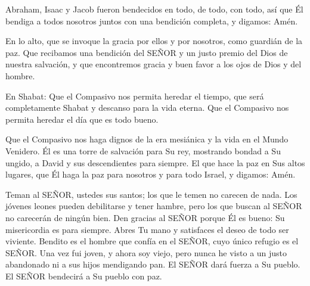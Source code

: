\documentclass[12pt,twoside]{article}
\begin{document}
{\begin{minipage}[t]{\linewidth}
{Abraham, Isaac y Jacob fueron bendecidos en todo, de todo, con todo,  
así que Él bendiga a todos nosotros juntos con una bendición completa,  
y digamos: Amén.\par\vspace{0.1em}
En lo alto, que se invoque la gracia por ellos y por nosotros,  
como guardián de la paz.  
Que recibamos una bendición del SEÑOR  
y un justo premio del Dios de nuestra salvación,  
y que encontremos gracia y buen favor a los ojos de Dios y del hombre.\par\vspace{0.2em}
En Shabat: Que el Compasivo nos permita heredar  
el tiempo, que será completamente Shabat  
y descanso para la vida eterna.  
Que el Compasivo nos permita heredar el día que es todo bueno.\par\vspace{0.2em}
Que el Compasivo nos haga dignos  
de la era mesiánica y la vida en el Mundo Venidero.  
Él es una torre de salvación para Su rey,  
mostrando bondad a Su ungido,  
a David y sus descendientes para siempre.  
El que hace la paz en Sus altos lugares,  
que Él haga la paz para nosotros y para todo Israel, y digamos: Amén.\par

Teman al SEÑOR, ustedes sus santos;  
los que le temen no carecen de nada.  
Los jóvenes leones pueden debilitarse y tener hambre,  
pero los que buscan al SEÑOR no carecerán de ningún bien.  
Den gracias al SEÑOR porque Él es bueno:  
Su misericordia es para siempre.  
Abres Tu mano  
y satisfaces el deseo de todo ser viviente.  
Bendito es el hombre  
que confía en el SEÑOR,  
cuyo único refugio es el SEÑOR.  
Una vez fui joven, y ahora soy viejo,  
pero nunca he visto a un justo abandonado  
ni a sus hijos mendigando pan.  
El SEÑOR dará fuerza a Su pueblo.  
El SEÑOR bendecirá a Su pueblo con paz.\par
}
\end{minipage}
}
\end{document}
